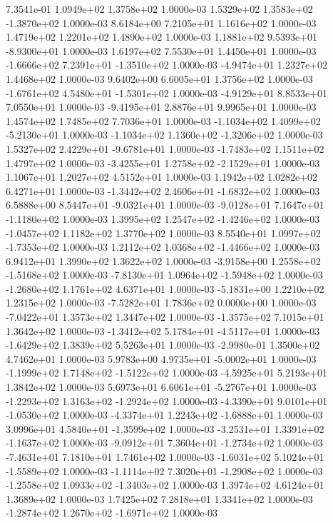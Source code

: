 7.3541e-01 1.0949e+02 1.3758e+02  1.0000e-03
 1.5329e+02  1.3583e+02 -1.3870e+02  1.0000e-03
8.6184e+00 7.2105e+01 1.1616e+02  1.0000e-03
1.4719e+02 1.2201e+02 1.4890e+02  1.0000e-03
 1.1881e+02  9.5393e+01 -8.9300e+01  1.0000e-03
1.6197e+02 7.5530e+01 1.4450e+01  1.0000e-03
-1.6666e+02  7.2391e+01 -1.3510e+02  1.0000e-03
-4.9474e+01  1.2327e+02  1.4468e+02  1.0000e-03
9.6402e+00 6.6005e+01 1.3756e+02  1.0000e-03
-1.6761e+02  4.5480e+01 -1.5301e+02  1.0000e-03
-4.9129e+01  8.8533e+01  7.0550e+01  1.0000e-03
-9.4195e+01  2.8876e+01  9.9965e+01  1.0000e-03
1.4574e+02 1.7485e+02 7.7036e+01  1.0000e-03
-1.1034e+02  1.4099e+02 -5.2130e+01  1.0000e-03
-1.1034e+02  1.1360e+02 -1.3206e+02  1.0000e-03
 1.5327e+02  2.4229e+01 -9.6781e+01  1.0000e-03
-1.7483e+02  1.1511e+02  1.4797e+02  1.0000e-03
-3.4255e+01  1.2758e+02 -2.1529e+01  1.0000e-03
1.1067e+01 1.2027e+02 4.5152e+01  1.0000e-03
1.1942e+02 1.0282e+02 6.4271e+01  1.0000e-03
-1.3442e+02  2.4606e+01 -1.6832e+02  1.0000e-03
 6.5888e+00  8.5447e+01 -9.0321e+01  1.0000e-03
-9.0128e+01  7.1647e+01 -1.1180e+02  1.0000e-03
 1.3995e+02  1.2547e+02 -1.4246e+02  1.0000e-03
-1.0457e+02  1.1182e+02  1.3770e+02  1.0000e-03
 8.5540e+01  1.0997e+02 -1.7353e+02  1.0000e-03
 1.2112e+02  1.0368e+02 -1.4466e+02  1.0000e-03
6.9412e+01 1.3990e+02 1.3622e+02  1.0000e-03
-3.9158e+00  1.2558e+02 -1.5168e+02  1.0000e-03
-7.8130e+01  1.0964e+02 -1.5948e+02  1.0000e-03
-1.2680e+02  1.1761e+02  4.6371e+01  1.0000e-03
-5.1831e+00  1.2210e+02  1.2315e+02  1.0000e-03
-7.5282e+01  1.7836e+02  0.0000e+00  1.0000e-03
-7.0422e+01  1.3573e+02  1.3447e+02  1.0000e-03
-1.3575e+02  7.1015e+01  1.3642e+02  1.0000e-03
-1.3412e+02  5.1784e+01 -4.5117e+01  1.0000e-03
-1.6429e+02  1.3839e+02  5.5263e+01  1.0000e-03
-2.9980e-01  1.3500e+02  4.7462e+01  1.0000e-03
 5.9783e+00  4.9735e+01 -5.0002e+01  1.0000e-03
-1.1999e+02  1.7148e+02 -1.5122e+02  1.0000e-03
-4.5925e+01  5.2193e+01  1.3842e+02  1.0000e-03
 5.6973e+01  6.6061e+01 -5.2767e+01  1.0000e-03
-1.2293e+02  1.3163e+02 -1.2924e+02  1.0000e-03
-4.3390e+01  9.0101e+01 -1.0530e+02  1.0000e-03
-4.3374e+01  1.2243e+02 -1.6888e+01  1.0000e-03
 3.0996e+01  4.5840e+01 -1.3599e+02  1.0000e-03
-3.2531e+01  1.3391e+02 -1.1637e+02  1.0000e-03
-9.0912e+01  7.3604e+01 -1.2734e+02  1.0000e-03
-7.4631e+01  7.1810e+01  1.7461e+02  1.0000e-03
-1.6031e+02  5.1024e+01 -1.5589e+02  1.0000e-03
-1.1114e+02  7.3020e+01 -1.2908e+02  1.0000e-03
-1.2558e+02  1.0933e+02 -1.3403e+02  1.0000e-03
1.3974e+02 4.6124e+01 1.3689e+02  1.0000e-03
1.7425e+02 7.2818e+01 1.3341e+02  1.0000e-03
-1.2874e+02  1.2670e+02 -1.6971e+02  1.0000e-03
